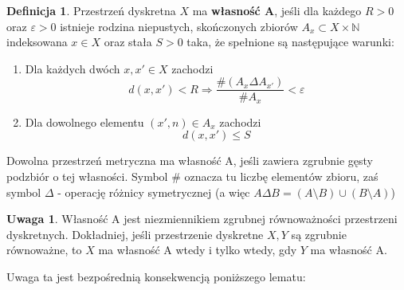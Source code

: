 \documentclass[licencjacka]{pracamgr}
\theoremstyle{definition}
\newtheorem{definition}{Definicja}[section]
\theoremstyle{definition}
\newtheorem{remark}{Uwaga}[section]
\theoremstyle{definition}
\theoremstyle{definition}
\theoremstyle{definition}
\theoremstyle{plain}
\theoremstyle{plain}
\begin{document}
\begin{definition}\label{def:propA}
	Przestrzeń dyskretna $ X $ ma \textbf{własność A}, jeśli dla każdego $ R>0 $ oraz 
	$ \varepsilon > 0 $ istnieje rodzina niepustych, skończonych zbiorów $ A_x \subset 
	X \times \mathbb{N} $ indeksowana $ x \in X $ oraz stała $ S > 0 $ taka, że 
	spełnione są następujące warunki:
	\begin{enumerate}
		\item Dla każdych dwóch $ x,x' \in X $ zachodzi
		$$ d(x,x') < R \Rightarrow \frac{\# (A_x \Delta A_{x'})}{\# A_x} < \varepsilon$$
		\item Dla dowolnego elementu $(x', n) \in A_x$ zachodzi $$ d(x,x') \leq S $$
	\end{enumerate}
	Dowolna przestrzeń metryczna ma własność A, jeśli zawiera zgrubnie gęsty podzbiór 
	o tej własności. Symbol $ \# $ oznacza tu liczbę elementów zbioru, zaś symbol 
	$ \Delta $ - operację różnicy symetrycznej 
	(a więc $A \Delta B = (A \setminus B) \cup (B \setminus A)$)
\end{definition}

\begin{remark}
	Własność A jest niezmiennikiem zgrubnej równoważności przestrzeni dyskretnych. 
	Dokładniej, jeśli przestrzenie dyskretne $ X,Y $ są zgrubnie równoważne, to 
	$ X $ ma własność A wtedy i tylko wtedy, gdy $ Y $ ma własność A.
\end{remark}

Uwaga ta jest bezpośrednią konsekwencją poniższego lematu:
\end{document}
